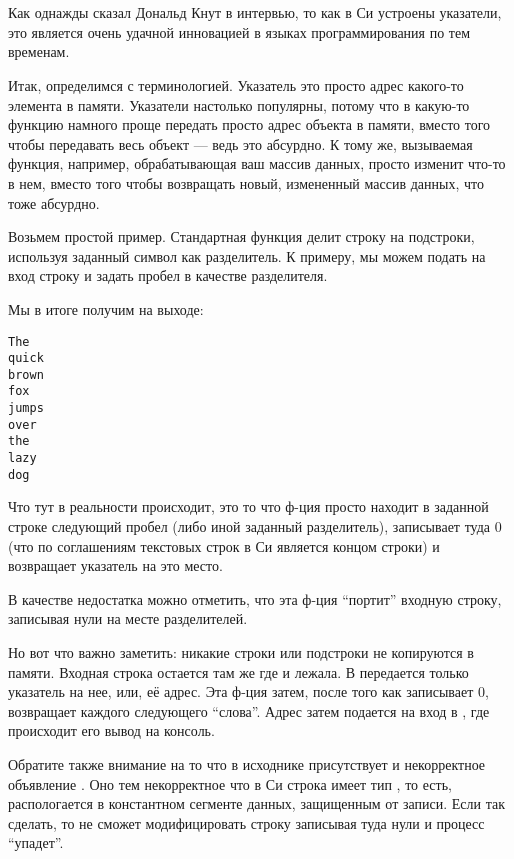 ﻿\section{}

Как однажды сказал Дональд Кнут в интервью\cite{KnuthInterview1993}, то как в Си устроены указатели, это является
очень удачной инновацией в языках программирования по тем временам.

Итак, определимся с терминологией. Указатель это просто адрес какого-то элемента в памяти. Указатели настолько
популярны, потому что в какую-то функцию намного проще передать просто адрес объекта в памяти, вместо того
чтобы передавать весь объект --- ведь это абсурдно. К тому же, вызываемая функция, например, обрабатывающая
ваш массив данных, просто изменит что-то в нем, вместо того чтобы возвращать новый, измененный массив данных, 
что тоже абсурдно.

Возьмем простой пример. Стандартная функция  делит строку на подстроки, используя заданный символ
как разделитель. К примеру, мы можем подать на вход строку  
и задать пробел в качестве разделителя.



Мы в итоге получим на выходе:

\begin{lstlisting}
The
quick
brown
fox
jumps
over
the
lazy
dog
\end{lstlisting}

Что тут в реальности происходит, это то что ф-ция  просто находит в заданной строке следующий пробел 
(либо иной заданный разделитель),
записывает туда $0$ (что по соглашениям текстовых строк в Си является концом строки) и возвращает указатель на это
место.

В качестве недостатка  можно отметить, что эта ф-ция ``портит'' входную строку, записывая нули
на месте разделителей.

Но вот что важно заметить: никакие строки или подстроки не копируются в памяти. Входная
строка остается там же где и лежала. В  передается только указатель на нее, или, её адрес.
Эта ф-ция затем, после
того как записывает $0$, возвращает  каждого следующего ``слова''.
Адрес затем подается на вход в , где происходит его вывод на консоль.

Обратите также внимание на то что в исходнике присутствует и некорректное объявление . Оно тем некорректное
что в Си строка имеет тип , то есть, распологается в константном сегменте данных, защищенным
от записи.
Если так сделать, то  не сможет модифицировать строку записывая туда нули и процесс ``упадет''.

